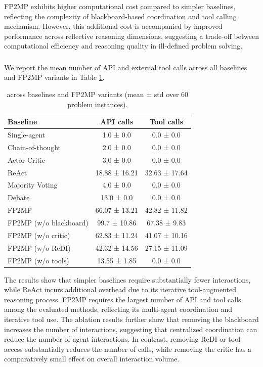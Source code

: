 FP2MP exhibits higher computational cost compared to simpler baselines, reflecting the complexity of blackboard-based coordination and tool calling mechanism.
However, this additional cost is accompanied by improved performance across reflective reasoning dimensions, suggesting a trade-off between computational efficiency and reasoning quality in ill-defined problem solving.

\subsubsection{}

We report the mean number of API and external tool calls across all baselines and FP2MP variants in Table \ref{table:api_tool_calls}.

\begin{table}[h]
\centering
\small
\begin{tabular}{lcc}
\hline
\textbf{Baseline} & \textbf{API calls}& \textbf{Tool calls}\\
\hline
Single-agent & 1.0 ± 0.0& 0.0 ± 0.0\\
Chain-of-thought & 2.0 ± 0.0& 0.0 ± 0.0\\
Actor-Critic & 3.0 ± 0.0& 0.0 ± 0.0\\
ReAct & 18.88 ± 16.21& 32.63 ± 17.64\\
Majority Voting & 4.0 ± 0.0& 0.0 ± 0.0\\
Debate & 13.0 ± 0.0& 0.0 ± 0.0\\
FP2MP & 66.07 ± 13.21& 42.82 ± 11.82\\
\hline
FP2MP (w/o blackboard) & 99.7 ± 10.86& 67.38 ± 9.83\\
FP2MP (w/o critic) & 62.83 ± 11.24& 41.07 ± 10.16\\
FP2MP (w/o ReDI) & 42.32 ± 14.56& 27.15 ± 11.09\\
FP2MP (w/o tools) & 13.55 ± 1.85& 0.0 ± 0.0\\
\hline
\end{tabular}
\caption{ across baselines and FP2MP variants (mean ± std over 60 problem instances).}
\label{table:api_tool_calls}
\end{table}

The results show that simpler baselines require substantially fewer interactions, while ReAct incurs additional overhead due to its iterative tool-augmented reasoning process.
FP2MP requires the largest number of API and tool calls among the evaluated methods, reflecting its multi-agent coordination and iterative tool use.
The ablation results further show that removing the blackboard increases the number of interactions, suggesting that centralized coordination can reduce the number of agent interactions.
In contrast, removing ReDI or tool access substantially reduces the number of calls, while removing the critic has a comparatively small effect on overall interaction volume.